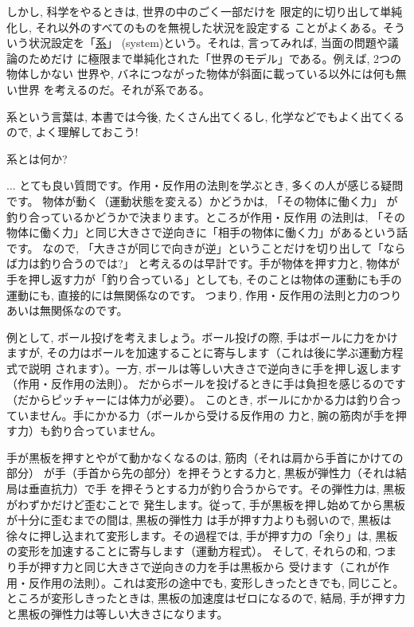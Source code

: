 しかし, 科学をやるときは, 世界の中のごく一部だけを
限定的に切り出して単純化し, それ以外のすべてのものを無視した状況を設定する
ことがよくある。そういう状況設定を「\underline{系}」
(system)という。それは, 言ってみれば, 当面の問題や議論のためだけ
に極限まで単純化された「世界のモデル」である。例えば, 2つの物体しかない
世界や, バネにつながった物体が斜面に載っている以外には何も無い世界
を考えるのだ。それが系である。

系という言葉は, 本書では今後, たくさん出てくるし, 化学などでもよく出てくるので, 
よく理解しておこう!

\begin{q}\label{q:whatissystem} 系とは何か?\end{q}


\begin{faq}{\small{}
... とても良い質問です。作用・反作用の法則を学ぶとき, 多くの人が感じる疑問です。
物体が動く（運動状態を変える）かどうかは, 「その物体に働く力」
が釣り合っているかどうかで決まります。ところが作用・反作用
の法則は, 「その物体に働く力」と同じ大きさで逆向きに「相手の物体に働く力」があるという話です。
なので, 「大きさが同じで向きが逆」ということだけを切り出して「ならば力は釣り合うのでは?」
と考えるのは早計です。手が物体を押す力と, 物体が手を押し返す力が「釣り合っている」としても, 
そのことは物体の運動にも手の運動にも, 直接的には無関係なのです。
つまり, 作用・反作用の法則と力のつりあいは無関係なのです。

例として, ボール投げを考えましょう。ボール投げの際, 手はボールに力をかけますが, 
その力はボールを加速することに寄与します（これは後に学ぶ運動方程式で説明
されます）。一方, ボールは等しい大きさで逆向きに手を押し返します（作用・反作用の法則）。
だからボールを投げるときに手は負担を感じるのです（だからピッチャーには体力が必要）。
このとき, ボールにかかる力は釣り合っていません。手にかかる力（ボールから受ける反作用の
力と, 腕の筋肉が手を押す力）も釣り合っていません。

手が黒板を押すとやがて動かなくなるのは, 筋肉（それは肩から手首にかけての部分）
が手（手首から先の部分）を押そうとする力と, 黒板が弾性力（それは結局は垂直抗力）で手
を押そうとする力が釣り合うからです。その弾性力は, 黒板がわずかだけど歪むことで
発生します。従って, 手が黒板を押し始めてから黒板が十分に歪むまでの間は, 黒板の弾性力
は手が押す力よりも弱いので, 黒板は徐々に押し込まれて変形します。その過程では, 
手が押す力の「余り」は, 黒板の変形を加速することに寄与します（運動方程式）。
そして, それらの和, つまり手が押す力と同じ大きさで逆向きの力を手は黒板から
受けます（これが作用・反作用の法則）。これは変形の途中でも, 変形しきったときでも, 
同じこと。ところが変形しきったときは, 黒板の加速度はゼロになるので, 
結局, 手が押す力と黒板の弾性力は等しい大きさになります。}\end{faq}

